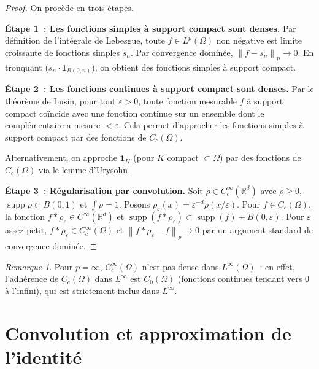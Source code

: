 \documentclass[a4paper,12pt]{book}
\DeclareMathOperator{\supp}{supp}
\newcommand{\R}{\mathbb{R}}
\newcommand{\norm}[1]{\left\| #1 \right\|}
\theoremstyle{definition}
\theoremstyle{plain}
\theoremstyle{remark}
\newtheorem{remarque}[definition]{Remarque}
\begin{document}
\begin{proof}
On procède en trois étapes.

\textbf{Étape 1~: Les fonctions simples à support compact sont denses.}
Par définition de l'intégrale de Lebesgue, toute $f \in L^p(\Omega)$ non négative est
limite croissante de fonctions simples $s_n$. Par convergence dominée,
$\norm{f - s_n}_p \to 0$. En tronquant ($s_n \cdot \mathbf{1}_{B(0,n)}$), on obtient
des fonctions simples à support compact.

\textbf{Étape 2~: Les fonctions continues à support compact sont denses.}
Par le théorème de Lusin, pour tout $\varepsilon > 0$, toute fonction mesurable $f$ à
support compact coïncide avec une fonction continue sur un ensemble dont le complémentaire
a mesure $< \varepsilon$. Cela permet d'approcher les fonctions simples à support compact
par des fonctions de $C_c(\Omega)$.

Alternativement, on approche $\mathbf{1}_K$ (pour $K$ compact $\subset \Omega$) par des
fonctions de $C_c(\Omega)$ via le lemme d'Urysohn.

\textbf{Étape 3~: Régularisation par convolution.}
Soit $\rho \in C_c^\infty(\R^d)$ avec $\rho \ge 0$, $\supp \rho \subset B(0,1)$ et
$\int \rho = 1$. Posons $\rho_\varepsilon(x) = \varepsilon^{-d}\rho(x/\varepsilon)$.
Pour $f \in C_c(\Omega)$, la fonction $f * \rho_\varepsilon \in C^\infty(\R^d)$ et
$\supp(f * \rho_\varepsilon) \subset \supp(f) + B(0,\varepsilon)$. Pour $\varepsilon$
assez petit, $f * \rho_\varepsilon \in C_c^\infty(\Omega)$ et
$\norm{f * \rho_\varepsilon - f}_p \to 0$ par un argument standard de convergence dominée.
\end{proof}

\begin{remarque}
Pour $p = \infty$, $C_c^\infty(\Omega)$ n'est pas dense dans $L^\infty(\Omega)$~: en
effet, l'adhérence de $C_c(\Omega)$ dans $L^\infty$ est $C_0(\Omega)$ (fonctions
continues tendant vers $0$ à l'infini), qui est strictement inclus dans $L^\infty$.
\end{remarque}

\section{Convolution et approximation de l'identité}
\end{document}
